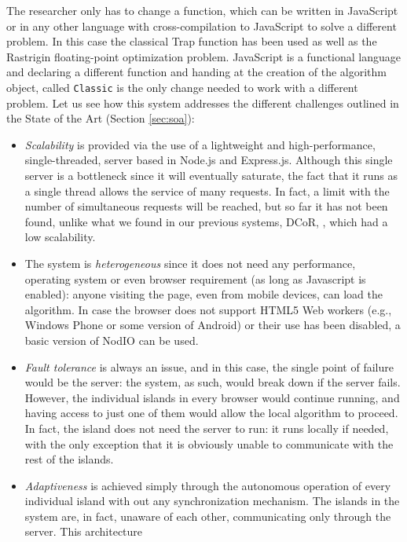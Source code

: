 \documentclass[journal,onecolumn]{IEEEtran}
\begin{document}
The researcher only has to change a function, which can be written in
JavaScript or in any other language with cross-compilation to
JavaScript \cite{web:compilersjs} to solve a different
problem. In this case the classical Trap function \cite{Ackley1987} has been
used as well as the Rastrigin floating-point optimization
problem. JavaScript is a functional language and declaring a different 
function and handing at the creation of the algorithm object, called
{\tt Classic} is the only change needed to work with a different
problem. Let us see how this system addresses the different challenges
outlined in the State of the Art (Section \ref{sec:soa}):
\begin{itemize}
\item {\em Scalability} is provided via the use of a lightweight and
  high-performance, single-threaded, server based in Node.js and
  Express.js. Although this single server is a bottleneck since it
  will eventually saturate, the fact that it runs as a single thread
  allows the service of many requests. In fact, a limit with the
  number of simultaneous requests will be reached, but so far it has
  not been found, unlike what we found in our previous systems, DCoR,
  \cite{gecco07:workshop:dcor}, which had a low scalability. 
\item The system is {\em heterogeneous} since it does not need any
  performance, operating system or even browser requirement (as long
  as Javascript is enabled): anyone
  visiting the page, even from mobile devices, can load the algorithm.
  In case the browser does not support HTML5 Web workers (e.g., 
  Windows Phone or some version of Android) or their use
  has been disabled, a basic version of NodIO can be used.
\item {\em Fault tolerance} is always an issue, and in this case, the
  single point of failure would be the server: the system, as such,
  would break down if the server fails. However, the individual
  islands in every browser would continue running, and having access
  to just one of them would allow the local algorithm to proceed. In
  fact, the island does not need the server to run: it runs locally if
  needed, with the only exception that it is obviously unable to
  communicate with the rest of the islands.
\item {\em Adaptiveness} is achieved simply through the autonomous
  operation of every individual island with out any synchronization
  mechanism. The islands in the system are, in fact, unaware of each
  other, communicating only through the server. This architecture 

\end{itemize}
\end{document}
